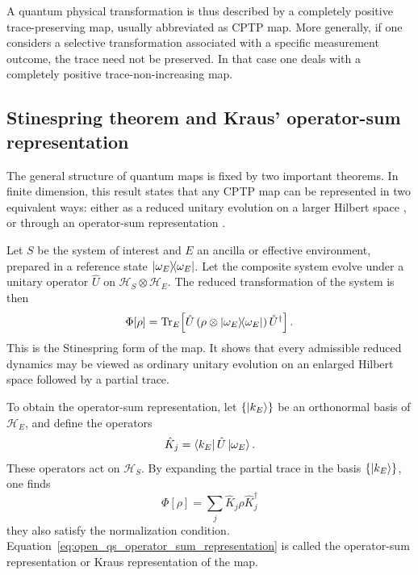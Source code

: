 A quantum physical transformation is thus described by a completely positive trace-preserving map, usually abbreviated as CPTP map. More generally, if one considers a selective transformation associated with a specific measurement outcome, the trace need not be preserved. In that case one deals with a completely positive trace-non-increasing map.

\subsection{Stinespring theorem and Kraus' operator-sum representation}
\label{subsec:kraus_stinespring_theorem_and_operator_sum_representation}

The general structure of quantum maps is fixed by two important theorems. In finite dimension, this result states that any CPTP map can be represented in two equivalent ways: either as a reduced unitary evolution on a larger Hilbert space \cite{Sti55}, or through an operator-sum representation \cite{Kraus71}.

Let \(S\) be the system of interest and \(E\) an ancilla or effective environment, prepared in a reference state \(\dyad{\omega_E}{\omega_E}\). Let the composite system evolve under a unitary operator \(\hat U\) on \(\mathcal{H}_S \otimes \mathcal{H}_E\). The reduced transformation of the system is then
\begin{equation}
	\Phi[\rho]
	=
	\Tr_E\!\left[
	\hat U
	\left(
	\rho \otimes \dyad{\omega_E}{\omega_E}
	\right)
	\hat U^\dagger
	\right].
	\label{eq:open_qs_stinespring_dilation}
\end{equation}
This is the Stinespring form of the map. It shows that every admissible reduced dynamics may be viewed as ordinary unitary evolution on an enlarged Hilbert space followed by a partial trace.

To obtain the operator-sum representation, let \(\{\ket{k_E}\}\) be an orthonormal basis of \(\mathcal{H}_E\), and define the operators
\begin{equation}
	\hat K_j=\bra{k_E}\hat U\ket{\omega_E}.
	\label{eq:open_qs_kraus_operators_from_dilation}
\end{equation}
These operators act on \(\mathcal{H}_S\). By expanding the partial trace in the basis \(\{\ket{k_E}\}\), one finds
\begin{equation}
	\Phi[\rho]
	=
	\sum_j \hat K_j \rho \hat K_j^\dagger
	\label{eq:open_qs_operator_sum_representation}
\end{equation}
they also satisfy the normalization condition.
Equation~\eqref{eq:open_qs_operator_sum_representation} is called the operator-sum representation or Kraus representation of the map.

